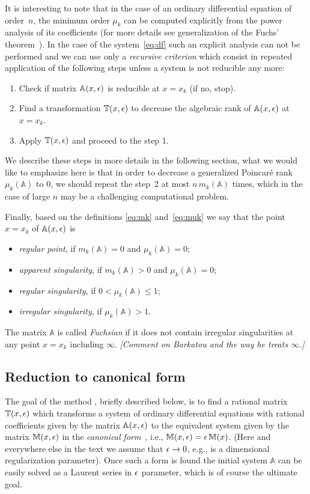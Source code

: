 \documentclass[12pt,a4paper]{article}
\def\M#1{\mathbb{#1}} %
\begin{document}
It is interesting to note that in the case of an ordinary differential equation of order~$n$, the minimum order $\mu_k$ can be computed explicitly from the power analysis of its coefficients (for more details see generalization of the Fuchs' theorem~\cite{Mos59}).
In the case of the system~\eqref{eq:df} such an explicit analysis can not be performed and we can use only a {\em recursive criterion} which consist in repeated application of the following steps unless a system is not reducible any more:
\begin{enumerate}
  \item Check if matrix $\M A(x,\eps)$ is reducible at $x=x_k$ (if no, stop).
  \item Find a transformation $\M T(x,\eps)$ to decrease the algebraic rank of $\M A(x,\eps)$ at $x=x_k$.
  \item Apply $\M T(x,\eps)$ and proceed to the step 1.
\end{enumerate}
We describe these steps in more details in the following section, what we would like to emphasize here is that in order to decrease a generalized Poincar\'e rank $\mu_k(\M A)$ to 0, we should repeat the step~2 at most $n\, m_k(\M A)$ times, which in the case of large $n$ may be a challenging computational problem.

Finally, based on the definitions \eqref{eq:mk} and~\eqref{eq:muk} we say that the point $x=x_k$ of $\M A(x,\eps)$ is
\begin{itemize}
  \item {\em regular point}, if $m_k(\M A) = 0$ and $\mu_k(\M A) = 0$;
  \item {\em apparent singularity}, if $m_k(\M A) > 0$ and $\mu_k(\M A) = 0$;
  \item {\em regular singularity}, if $0 < \mu_k(\M A) \le 1$;
  \item {\em irregular singularity}, if $\mu_k(\M A) > 1$.
\end{itemize}
The matrix $\M A$ is called {\em Fuchsian} if it does not contain irregular singularities at any point $x=x_k$ including $\infty$.
{\em [Comment on Barkatou and the way he treats $\infty$.]}


\subsection{Reduction to canonical form}

The goal of the method \cite{Lee15}, briefly described below, is to find a rational matrix $\M T(x,\eps)$ which transforms a system of ordinary differential equations with rational coefficients given by the matrix $\M A(x,\eps)$ to the equivalent system given by the matrix $\M M(x,\eps)$ in the {\em canonical form}~\cite{Henn13}, i.e., $\M M(x,\eps) = \eps\, \M M(x)$.
(Here and everywhere else in the text we assume that $\epsilon \to 0$, e.g., is a dimensional regularization parameter).
Once such a form is found the initial system $\M A$ can be easily solved as a Laurent series in $\epsilon$ parameter, which is of course the ultimate goal.
\end{document}
